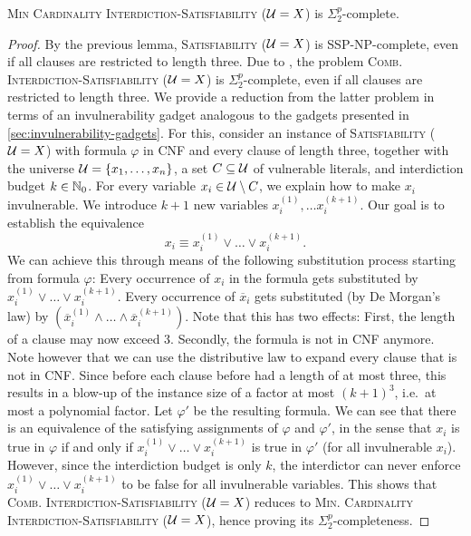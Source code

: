 \begin{theorem}
    \textsc{Min Cardinality Interdiction-Satisfiability ($\mathcal{U} = X$)} is $\Sigma^p_2$-complete.
\end{theorem}
\begin{proof}
    By the previous lemma, \textsc{Satisfiability ($\mathcal{U} = X$)} is SSP-NP-complete, even if all clauses are restricted to length three.
    Due to \cite{gruene2024completeness}, the problem \textsc{Comb. Interdiction-Satisfiability ($\mathcal{U} = X$)} is $\Sigma^p_2$-complete, even if all clauses are restricted to length three.
    We provide a reduction from the latter problem in terms of an invulnerability gadget analogous to the gadgets presented in \cref{sec:invulnerability-gadgets}. 
    For this, consider an instance of \textsc{Satisfiability ($\mathcal{U} = X$)} with formula $\varphi$ in CNF and every clause of length three, together with the universe $\mathcal{U} = \{ x_1, \ldots, x_n \}$, a set $C \subseteq \mathcal{U}$ of vulnerable literals, and interdiction budget $k \in \mathbb{N}_0$.
    For every variable $x_i \in \mathcal{U} \setminus C$, we explain how to make $x_i$ invulnerable.
    We introduce $k+1$ new variables $x^{(1)}_i, \dots x^{(k+1)}_i$.
    Our goal is to establish the equivalence
    \[
        x_i \equiv x^{(1)}_i \lor \dots \lor x^{(k+1)}_i.
    \]
    We can achieve this through means of the following substitution process starting from formula $\varphi$: 
    Every occurrence of $x_i$ in the formula gets substituted by $x^{(1)}_i \lor \dots \lor x^{(k+1)}_i$. 
    Every occurrence of $\overline x_i$ gets substituted (by De Morgan's law) by $(\overline x^{(1)}_i \land \dots \land \overline x^{(k+1)}_i)$.
    Note that this has two effects: 
    First, the length of a clause may now exceed 3.
    Secondly, the formula is not in CNF anymore. 
    Note however that we can use the distributive law to expand every clause that is not in CNF. 
    Since before each clause before had a length of at most three, this results in a blow-up of the instance size of a factor at most $(k+1)^3$, i.e.\ at most a polynomial factor.
    Let $\varphi'$ be the resulting formula. 
    We can see that there is an equivalence of the satisfying assignments of $\varphi$ and $\varphi'$, in the sense that $x_i$ is true in $\varphi$ if and only if $x^{(1)}_i \lor \dots \lor x^{(k+1)}_i$ is true in $\varphi'$ (for all invulnerable $x_i$). 
    However, since the interdiction budget is only $k$, the interdictor can never enforce $x^{(1)}_i \lor \dots \lor x^{(k+1)}_i$ to be false for all invulnerable variables.
    This shows that \textsc{Comb. Interdiction-Satisfiability ($\mathcal{U} = X$)} reduces to \textsc{Min. Cardinality Interdiction-Satisfiability ($\mathcal{U} = X$)}, hence proving its $\Sigma^p_2$-completeness.
\end{proof}


